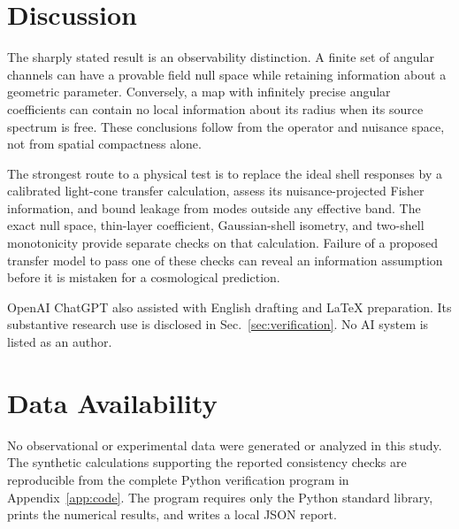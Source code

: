 \documentclass[aps,prd,reprint,amsmath,amssymb,nofootinbib,
longbibliography]{revtex4-2}
\begin{document}
\section{Discussion}

The sharply stated result is an observability distinction. A finite set
of angular channels can have a provable field null space while retaining
information about a geometric parameter. Conversely, a map with infinitely
precise angular coefficients can contain no local information about its
radius when its source spectrum is free. These conclusions follow from
the operator and nuisance space, not from spatial compactness alone.

The strongest route to a physical test is to replace the ideal shell
responses by a calibrated light-cone transfer calculation, assess its
nuisance-projected Fisher information, and bound leakage from modes
outside any effective band. The exact null space, thin-layer coefficient,
Gaussian-shell isometry, and two-shell monotonicity provide separate
checks on that calculation. Failure of a proposed transfer model to pass
one of these checks can reveal an information assumption before it is
mistaken for a cosmological prediction.

\begin{acknowledgments}
OpenAI ChatGPT also assisted with English drafting and LaTeX preparation.
Its substantive research use is disclosed in Sec.~\ref{sec:verification}.
No AI system is listed as an author.
\end{acknowledgments}

\section*{Data Availability}
No observational or experimental data were generated or analyzed in this
study. The synthetic calculations supporting the reported consistency
checks are reproducible from the complete Python verification program in
Appendix~\ref{app:code}. The program requires only the Python standard
library, prints the numerical results, and writes a local JSON report.

\appendix
\end{document}
